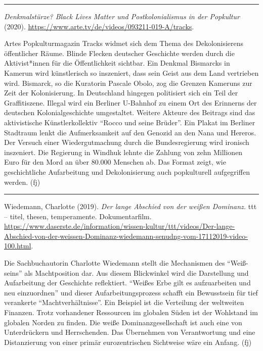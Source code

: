 \documentclass[a4paper,
fontsize=11pt,
oneside,
numbers=noperiodatend,
parskip=half-,
bibliography=totoc,
final
]{scrartcl}
\begin{document}
\begin{center}\rule{0.5\linewidth}{0.5pt}\end{center}

\pagebreak

\emph{Denkmalstürze? Black Lives Matter und Postkolonialismus in der
Popkultur} (2020).
\url{https://www.arte.tv/de/videos/093211-019-A/tracks}.

Artes Popkulturmagazin Tracks widmet sich dem Thema des Dekolonisierens
öffentlicher Räume. Blinde Flecken deutscher Geschichte werden durch die
Aktivist*innen für die Öffentlichkeit sichtbar. Ein Denkmal Bismarcks in
Kamerun wird künstlerisch so inszeniert, dass sein Geist aus dem Land
vertrieben wird. Bismarck, so die Kuratorin Pascale Obolo, zog die
Grenzen Kameruns zur Zeit der Kolonisierung. In Deutschland hingegen
politisiert sich ein Teil der Graffitiszene. Illegal wird ein Berliner
U-Bahnhof zu einem Ort des Erinnerns der deutschen Kolonialgeschichte
umgestaltet. Weitere Akteure des Beitrags sind das aktivistische
Künstlerkollektiv \enquote{Rocco und seine Brüder}. Ein Plakat im
Berliner Stadtraum lenkt die Aufmerksamkeit auf den Genozid an den Nana
und Hereros. Der Versuch einer Wiedergutmachung durch die
Bundesregierung wird ironisch inszeniert. Die Regierung in Windhuk
lehnte die Zahlung von zehn Millionen Euro für den Mord an über 80.000
Menschen ab. Das Format zeigt, wie geschichtliche Aufarbeitung und
Dekolonisierung auch popkulturell aufgegriffen werden. (fj)

\begin{center}\rule{0.5\linewidth}{0.5pt}\end{center}

Wiedemann, Charlotte (2019). \emph{Der lange Abschied von der weißen
Dominanz.} ttt -- titel, thesen, temperamente. Dokumentarfilm.
\url{https://www.daserste.de/information/wissen-kultur/ttt/videos/Der-lange-Abschied-von-der-weissen-Dominanz-wiedemann-senudng-vom-17112019-video-100.html}.

Die Sachbuchautorin Charlotte Wiedemann stellt die Mechanismen des
\enquote{Weiß-seins} als Machtposition dar. Aus diesem Blickwinkel wird
die Darstellung und Aufarbeitung der Geschichte reflektiert.
\enquote{Weißes Erbe gilt es aufzuarbeiten und neu einzuordnen} und
dieser Aufarbeitungsprozess schafft ein Bewusstsein für tief verankerte
\enquote{Machtverhältnisse}. Ein Beispiel ist die Verteilung der
weltweiten Finanzen. Trotz vorhandener Ressourcen im globalen Süden ist
der Wohlstand im globalen Norden zu finden. Die weiße
Dominanzgesellschaft ist auch eine von Unterdrückern und Herrschenden.
Das Übernehmen von Verantwortung und eine Distanzierung von einer primär
eurozentrischen Sichtweise wäre ein Anfang. (fj)
\end{document}
